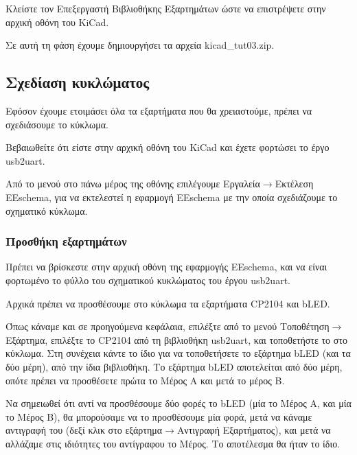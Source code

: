 \documentclass[a4paper]{article}
\begin{document}
Kλείστε τον Επεξεργαστή Βιβλιοθήκης Εξαρτημάτων ώστε να επιστρέψετε στην αρχική οθόνη του KiCad.

Σε αυτή τη φάση έχουμε δημιουργήσει τα αρχεία kicad\_tut03.zip.

\subsection{Σχεδίαση κυκλώματος}
Εφόσον έχουμε ετοιμάσει όλα τα εξαρτήματα που θα χρειαστούμε, πρέπει να σχεδιάσουμε το κύκλωμα. 

Βεβαιωθείτε ότι είστε στην αρχική οθόνη του KiCad και έχετε φορτώσει το έργο usb2uart.

Από το μενού στο πάνω μέρος της οθόνης επιλέγουμε Εργαλεία$\rightarrow$Εκτέλεση EEschema, για να εκτελεστεί η εφαρμογή EEschema με την οποία σχεδιάζουμε το σχηματικό κύκλωμα. 

\subsubsection{Προσθήκη εξαρτημάτων}

Πρέπει να βρίσκεστε στην αρχική οθόνη της εφαρμογής EEschema, και να είναι φορτωμένο το φύλλο του σχηματικού κυκλώματος του έργου usb2uart.

\begin{figure}
  \begin{center}
    \label{fig:kicad-main}
  \end{center}
\end{figure}

Αρχικά πρέπει να προσθέσουμε στο κύκλωμα τα εξαρτήματα CP2104 και bLED. 

Όπως κάναμε και σε προηγούμενα κεφάλαια, επιλέξτε από το μενού Τοποθέτηση$\rightarrow$Εξάρτημα, επιλέξτε το CP2104 από τη βιβλιοθήκη usb2uart, και τοποθετήστε το στο κύκλωμα. Στη συνέχεια κάντε το ίδιο για να τοποθετήσετε το εξάρτημα bLED (και τα δύο μέρη), από την ίδια βιβλιοθήκη. Το εξάρτημα bLED αποτελείται από δύο μέρη, οπότε πρέπει να προσθέσετε πρώτα το Μέρος Α και μετά το μέρος Β.

Να σημειωθεί ότι αντί να προσθέσουμε δύο φορές το bLED (μία το Μέρος Α, και μία το Μέρος Β), θα μπορούσαμε να το προσθέσουμε μία φορά, μετά να κάναμε αντιγραφή του (δεξί κλικ στο εξάρτημα$\rightarrow$Αντιγραφή Εξαρτήματος), και μετά να αλλάζαμε στις ιδιότητες του αντίγραφου το Μέρος. Το αποτέλεσμα θα ήταν το ίδιο.
\end{document}
